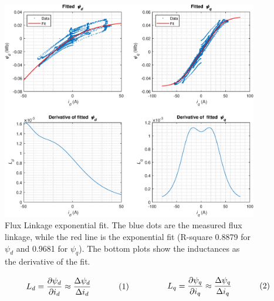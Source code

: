 \begin{figure}[!htb]
	\centering
	\includegraphics[width=1\textwidth]{Figures/Ldq.eps}
	\caption[Flux Linkage exponential fit.]{Flux Linkage exponential fit. The blue dots are the measured flux linkage, while the red line is the exponential fit (R-square 0.8879 for $\psi_d$ and 0.9681 for $\psi_q$). The bottom plots show the inductances as the derivative of the fit.}
	\label{fig:inductances_method_2} %
\end{figure}
\begin{subequations}
		\noindent
		\begin{minipage}{.5\linewidth}
			\begin{equation}
				L_{d} = \frac{\partial \psi_d}{\partial i_d} \approx \frac{\Delta \psi_d}{\Delta i_d}
			\end{equation}
		\end{minipage}%
		\begin{minipage}{.5\linewidth}
			\begin{equation}
				L_{q} = \frac{\partial \psi_q}{\partial i_q} \approx \frac{\Delta \psi_q}{\Delta i_q}
			\end{equation}
		\end{minipage}%
		\label{eq:flux_derivative_inductance}
	\end{subequations}
